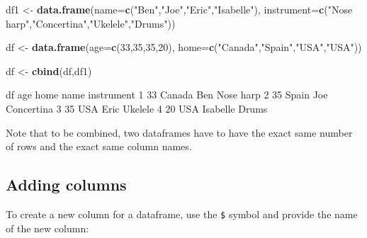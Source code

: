 \documentclass[]{book}
\newenvironment{Shaded}{\begin{snugshade}}{\end{snugshade}}
\newcommand{\DataTypeTok}[1]{\textcolor[rgb]{0.13,0.29,0.53}{#1}}
\newcommand{\DecValTok}[1]{\textcolor[rgb]{0.00,0.00,0.81}{#1}}
\newcommand{\KeywordTok}[1]{\textcolor[rgb]{0.13,0.29,0.53}{\textbf{#1}}}
\newcommand{\NormalTok}[1]{#1}
\newcommand{\OperatorTok}[1]{\textcolor[rgb]{0.81,0.36,0.00}{\textbf{#1}}}
\newcommand{\StringTok}[1]{\textcolor[rgb]{0.31,0.60,0.02}{#1}}
\begin{document}
\begin{Shaded}
\begin{Highlighting}[]
\NormalTok{df1 <-}\StringTok{ }\KeywordTok{data.frame}\NormalTok{(}\DataTypeTok{name=}\KeywordTok{c}\NormalTok{(}\StringTok{"Ben"}\NormalTok{,}\StringTok{"Joe"}\NormalTok{,}\StringTok{"Eric"}\NormalTok{,}\StringTok{"Isabelle"}\NormalTok{),}
                  \DataTypeTok{instrument=}\KeywordTok{c}\NormalTok{(}\StringTok{"Nose harp"}\NormalTok{,}\StringTok{"Concertina"}\NormalTok{,}\StringTok{"Ukelele"}\NormalTok{,}\StringTok{"Drums"}\NormalTok{))}

\NormalTok{df <-}\StringTok{ }\KeywordTok{data.frame}\NormalTok{(}\DataTypeTok{age=}\KeywordTok{c}\NormalTok{(}\DecValTok{33}\NormalTok{,}\DecValTok{35}\NormalTok{,}\DecValTok{35}\NormalTok{,}\DecValTok{20}\NormalTok{), }\DataTypeTok{home=}\KeywordTok{c}\NormalTok{(}\StringTok{"Canada"}\NormalTok{,}\StringTok{"Spain"}\NormalTok{,}\StringTok{"USA"}\NormalTok{,}\StringTok{"USA"}\NormalTok{))}

\NormalTok{df <-}\StringTok{ }\KeywordTok{cbind}\NormalTok{(df,df1)}

\NormalTok{df}
\NormalTok{  age   home     name instrument}
\DecValTok{1}  \DecValTok{33}\NormalTok{ Canada      Ben  Nose harp}
\DecValTok{2}  \DecValTok{35}\NormalTok{  Spain      Joe Concertina}
\DecValTok{3}  \DecValTok{35}\NormalTok{    USA     Eric    Ukelele}
\DecValTok{4}  \DecValTok{20}\NormalTok{    USA Isabelle      Drums}
\end{Highlighting}
\end{Shaded}

Note that to be combined, two dataframes have to have the exact same number of rows and the exact same column names.

\hypertarget{adding-columns}{%
\subsection*{Adding columns}\label{adding-columns}}

To create a new column for a dataframe, use the \texttt{\$} symbol and provide the name of the new column:

\begin{Shaded}
\end{Shaded}
\end{document}
